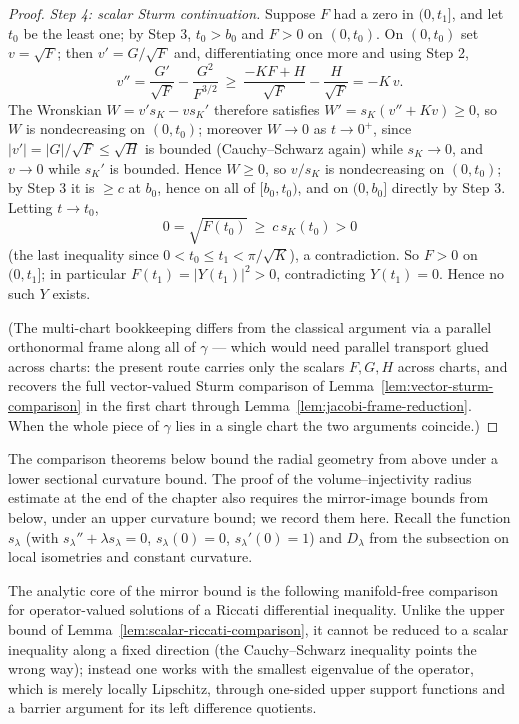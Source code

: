\begin{proof}
{\em Step 4: scalar Sturm continuation.} Suppose $F$ had a zero in
$(0,t_1]$, and let $t_0$ be the least one; by Step 3, $t_0>b_0$ and
$F>0$ on $(0,t_0)$. On $(0,t_0)$ set $v=\sqrt F$; then $v'=G/\sqrt F$
and, differentiating once more and using Step 2,
$$v''=\frac{G'}{\sqrt F}-\frac{G^2}{F^{3/2}}
\ \ge\ \frac{-KF+H}{\sqrt F}-\frac{H}{\sqrt F}=-K\,v .$$
The Wronskian $W=v's_K-vs_K'$ therefore satisfies
$W'=s_K(v''+Kv)\ge0$, so $W$ is nondecreasing on $(0,t_0)$; moreover
$W\to0$ as $t\to0^+$, since $|v'|=|G|/\sqrt F\le\sqrt H$ is bounded
(Cauchy--Schwarz again) while $s_K\to0$, and $v\to0$ while $s_K'$ is
bounded. Hence $W\ge0$, so $v/s_K$ is nondecreasing on $(0,t_0)$; by
Step 3 it is $\ge c$ at $b_0$, hence on all of $[b_0,t_0)$, and on
$(0,b_0]$ directly by Step 3. Letting $t\to t_0$,
$$0=\sqrt{F(t_0)}\ \ge\ c\,s_K(t_0)>0$$
(the last inequality since $0<t_0\le t_1<\pi/\sqrt K$), a
contradiction. So $F>0$ on $(0,t_1]$; in particular
$F(t_1)=|Y(t_1)|^2>0$, contradicting $Y(t_1)=0$. Hence no such $Y$
exists.

(The multi-chart bookkeeping differs from the classical argument via a
parallel orthonormal frame along all of $\gamma$ — which would need
parallel transport glued across charts: the present route carries only
the scalars $F,G,H$ across charts, and recovers the full vector-valued
Sturm comparison of Lemma~\ref{lem:vector-sturm-comparison} in the
first chart through Lemma~\ref{lem:jacobi-frame-reduction}. When the
whole piece of $\gamma$ lies in a single chart the two arguments
coincide.)
\end{proof}

The comparison theorems below bound the radial geometry from above
under a lower sectional curvature bound. The proof of the
volume--injectivity radius estimate at the end of the chapter also
requires the mirror-image bounds from below, under an upper
curvature bound; we record them here. Recall the function
$s_\lambda$ (with $s_\lambda''+\lambda s_\lambda=0$,
$s_\lambda(0)=0$, $s_\lambda'(0)=1$) and $D_\lambda$ from the
subsection on local isometries and constant curvature.

The analytic core of the mirror bound is the following
manifold-free comparison for operator-valued solutions of a Riccati
differential inequality. Unlike the upper bound of
Lemma~\ref{lem:scalar-riccati-comparison}, it cannot be reduced to
a scalar inequality along a fixed direction (the Cauchy--Schwarz
inequality points the wrong way); instead one works with the
smallest eigenvalue of the operator, which is merely locally
Lipschitz, through one-sided upper support functions and a barrier
argument for its left difference quotients.

